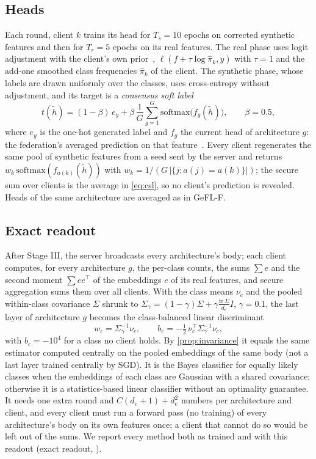 \subsection{Heads}\label{sec:method-heads}

Each round, client $k$ trains its head for $T_s=10$ epochs on corrected synthetic features and then for $T_r=5$
epochs on its real features. The real phase uses logit adjustment with the client's own prior~\cite{menon2021la},
$\ell(f+\tau\log\hat\pi_k,y)$ with $\tau=1$ and the add-one smoothed class frequencies $\hat\pi_k$ of the client. The
synthetic phase, whose labels are drawn uniformly over the classes, uses cross-entropy without adjustment, and its
target is a \emph{consensus soft label}
\begin{equation}\label{eq:csl}
t(\tilde h)=(1-\beta)\,e_y+\beta\,\frac1G\sum_{g=1}^G\mathrm{softmax}\big(f_g(\tilde h)\big),\qquad \beta=0.5,
\end{equation}
where $e_y$ is the one-hot generated label and $f_g$ the current head of architecture $g$: the federation's averaged
prediction on that feature~\cite{menon2021distill}. Every client regenerates the same pool of synthetic features from a
seed sent by the server and returns $w_k\,\mathrm{softmax}(f_{a(k)}(\tilde h))$ with $w_k=1/(G\,|\{j:a(j)=a(k)\}|)$; the
secure sum over clients is the average in \cref{eq:csl}, so no client's prediction is revealed. Heads of the same
architecture are averaged as in GeFL-F.

\subsection{Exact readout}\label{sec:method-readout}

After Stage III, the server broadcasts every architecture's body; each client computes, for every architecture $g$, the
per-class counts, the sums $\sum e$ and the second moment $\sum ee^\top$ of the embeddings $e$ of its real features, and
secure aggregation sums them over all clients. With the class means $\nu_c$ and the pooled within-class covariance
$\Sigma$ shrunk to $\Sigma_\gamma=(1-\gamma)\Sigma+\gamma\frac{\mathrm{tr}\,\Sigma}{d_e}I$, $\gamma=0.1$, the last layer of
architecture $g$ becomes the class-balanced linear discriminant
\begin{equation}\label{eq:er}
w_c=\Sigma_\gamma^{-1}\nu_c,\qquad b_c=-\tfrac12\,\nu_c^\top\Sigma_\gamma^{-1}\nu_c,
\end{equation}
with $b_c=-10^4$ for a class no client holds. By \cref{prop:invariance} it equals the same estimator computed
centrally on the pooled embeddings of the same body (not a last layer trained centrally by SGD). It is the Bayes
classifier for equally likely classes when the embeddings of each class are Gaussian with a shared covariance;
otherwise it is a statistics-based linear classifier without an optimality guarantee. It needs one extra round and
$C(d_e+1)+d_e^2$ numbers per architecture and client, and every client must run a forward pass (no training) of
every architecture's body on its own features once; a client that cannot do so would be left out of the sums. We
report every method both as trained and with this readout (exact readout, \ER).


